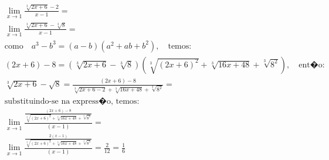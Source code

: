 \begin{ex}
\begin{align}
&\lim_{x\rightarrow 1} \frac{\sqrt[3]{2x+6}-2}{x-1}=\nonumber\\
&\lim_{x\rightarrow 1} \frac{\sqrt[3]{2x+6}-\sqrt[3]{8}}{x-1}=\nonumber\\
&\text{como}\quad a^3-b^3=(a-b)(a^2+ab+b^2),\quad\text{temos:}\nonumber\\
&(2x+6)-8=(\sqrt[3]{2x+6}-\sqrt[3]{8})(\sqrt[3]{(2x+6)^2}+\sqrt[3]{16x+48}+\sqrt[3]{8^2}),\quad\text{ent�o:}\nonumber\\
&\sqrt[3]{2x+6}-\sqrt{8}=\frac{(2x+6)-8}{\sqrt[3]{2x+6-2}+\sqrt[3]{16x+48}+\sqrt[3]{8^2}}=\nonumber\\
&\text{substituindo-se na express�o, temos:}\nonumber\\
&\lim_{x\rightarrow 1} \frac{\frac{(2x+6)-8}{\sqrt[3]{(2x+6)^2}+\sqrt[3]{16x+48}+\sqrt[3]{8^2}}}{(x-1)}=\nonumber\\
&\lim_{x\rightarrow 1} \frac{\frac{2(x-1)}{\sqrt[3]{(2x+6)^2}+\sqrt[3]{16x+48}+\sqrt[3]{8^2}}}{(x-1)}=\frac{2}{12}=\frac{1}{6}\nonumber
\end{align}
\end{ex}